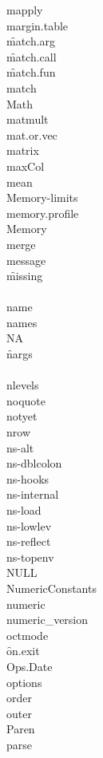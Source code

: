 \documentclass[12pt]{article}
\begin{document}
{mapply} \\
{margin.table} \\
\f{match.arg} \\
\f{match.call} \\
\f{match.fun} \\
{match} \\
{Math} \\
{matmult} \\
{mat.or.vec} \\
{matrix} \\
{maxCol} \\
{mean} \\
{Memory-limits} \\
{memory.profile} \\
{Memory} \\
{merge} \\
{message} \\
\f{missing} \\
 \\
{name} \\
{names} \\
{NA} \\
\f{nargs} \\
 \\
{nlevels} \\
{noquote} \\
{notyet} \\
{nrow} \\
{ns-alt} \\
{ns-dblcolon} \\
{ns-hooks} \\
{ns-internal} \\
{ns-load} \\
{ns-lowlev} \\
{ns-reflect} \\
{ns-topenv} \\
{NULL} \\
{NumericConstants} \\
{numeric} \\
{numeric\_version} \\
{octmode} \\
\f{on.exit} \\
{Ops.Date} \\
{options} \\
{order} \\
{outer} \\
{Paren} \\
{parse} \\
 \\
\end{document}
